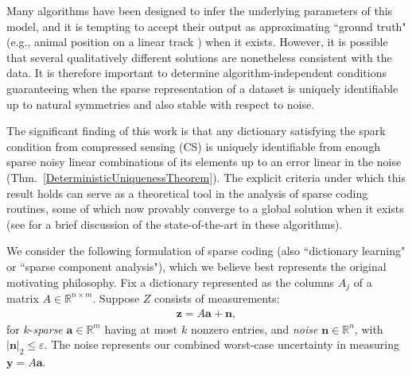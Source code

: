 \documentclass[journal, twocolumn]{IEEEtran}
\begin{document}
Many algorithms have been designed to infer the underlying parameters of this model, and it is tempting to accept their output as approximating ``ground truth" (e.g., animal position on a linear track \cite{Agarwal14}) when it exists. However, it is possible that several qualitatively different solutions are nonetheless consistent with the data. It is therefore important to determine algorithm-independent conditions guaranteeing when the sparse representation of a dataset is uniquely identifiable up to natural symmetries and also stable with respect to noise. 

The significant finding of this work is that any dictionary satisfying the spark condition from compressed sensing (CS) is uniquely identifiable from enough sparse noisy linear combinations of its elements up to an error linear in the noise (Thm.~\ref{DeterministicUniquenessTheorem}).
The explicit criteria under which this result holds can serve as a theoretical tool in the analysis of sparse coding routines, some of which now provably converge to a global solution when it exists (see \cite[Sec.~I-E]{Sun16} for a brief discussion of the state-of-the-art in these algorithms). 

We consider the following formulation of sparse coding (also ``dictionary learning" or ``sparse component analysis"), which we believe best represents the original motivating philosophy. Fix a dictionary represented as the columns $A_j$ of a matrix $A \in \mathbb R^{n \times m}$. Suppose  $Z$ consists of measurements:
\begin{align}\label{LinearModel}
\mathbf{z} = A\mathbf{a} + \mathbf{n},
\end{align}
for $k$-\emph{sparse} $\mathbf{a} \in \mathbb{R}^m$ having at most $k$ nonzero entries, and \emph{noise} $\mathbf{n} \in \mathbb{R}^n$, with $|\mathbf{n}|_2 \leq \varepsilon$. The noise represents our combined worst-case uncertainty in  measuring $\mathbf{y} = A\mathbf{a}$.
\end{document}
